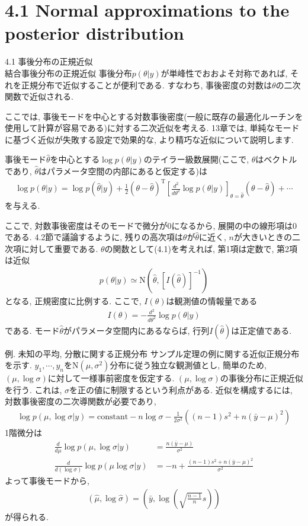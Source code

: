 \documentclass[10pt,dvipdfmx,a4]{beamer}
\newcommand{\eq}[1]{\begin{align}#1\end{align}}
\newcommand{\eqn}[1]{\begin{align*}#1\end{align*}}
\begin{document}
\section{4.1 Normal approximations to the posterior distribution}
\begin{frame}{4.1 事後分布の正規近似\\結合事後分布の正規近似}
事後分布$p(\theta|y)$が単峰性でおおよそ対称であれば, それを正規分布で近似することが便利である.
すなわち, 事後密度の対数は$\theta$の二次関数で近似される.

ここでは, 事後モードを中心とする対数事後密度(一般に既存の最適化ルーチンを使用して計算が容易である)に対する二次近似を考える.
13章では, 単純なモードに基づく近似が失敗する設定で効果的な, より精巧な近似について説明します.

事後モード$\hat{\theta}$を中心とする$\log p(\theta|y)$のテイラー級数展開(ここで, $\theta$はベクトルであり, $\hat{\theta}$はパラメータ空間の内部にあると仮定する)は
\eq{\log p(\theta|y)=\log p (\hat{\theta}|y)+\frac{1}{2}(\theta-\hat{\theta})^{\mathrm{T}}\left[ \frac{d^2}{d\theta^2} \log p(\theta|y)\right]_{\theta=\hat{\theta}}(\theta-\hat{\theta})+\cdots}
を与える.
\end{frame}


\begin{frame}
ここで, 対数事後密度はそのモードで微分が0になるから, 展開の中の線形項は0である.
4.2節で議論するように, 残りの高次項は$\theta$が$\hat{\theta}$に近く, $n$が大きいときの二次項に対して重要である.
$\theta$の関数として(4.1)を考えれば, 第1項は定数で, 第2項は近似
\eq{p(\theta|y)\simeq \text{N}(\hat{\theta},[I(\hat{\theta})]^{-1})}
となる, 正規密度に比例する.
ここで, $I(\theta)$は観測値の情報量である
\eqn{I(\theta)=-\frac{d^2}{d\theta^2}\log p(\theta|y)}
である.
モード$\hat{\theta}$がパラメータ空間内にあるならば, 行列$I(\hat{\theta})$は正定値である.
\end{frame}


\begin{frame}{例. 未知の平均, 分散に関する正規分布}
サンプル定理の例に関する近似正規分布を示す.
$y_1,\cdots,y_n$を$\text{N}(\mu,\sigma^2)$分布に従う独立な観測値とし, 簡単のため, $(\mu,\log \sigma)$に対して一様事前密度を仮定する.
$(\mu,\log \sigma)$の事後分布に正規近似を行う.
これは, $\sigma$を正の値に制限するという利点がある.
近似を構成するには, 対数事後密度の二次導関数が必要であり,
\eqn{\log p(\mu,\log \sigma|y)=\text{constant}-n\log \sigma-\frac{1}{2\sigma^2}((n-1)s^2+n(\bar{y}-\mu)^2)}
1階微分は
\eqn{\frac{d}{d\mu}\log p(\mu,\log \sigma|y)&=\frac{n(\bar{y}-\mu)}{\sigma^2}\\
\frac{d}{d(\log \sigma)}\log p(\mu\log \sigma|y)&=-n+\frac{(n-1)s^2+n(\bar{y}-\mu)^2}{\sigma^2}}
よって事後モードから,
\eqn{(\hat{\mu},\log\hat{\sigma})=\left( \bar{y},\log \left( \sqrt{\tfrac{n-1}{n}}s\right)\right)}
が得られる.
\end{frame}
\end{document}
